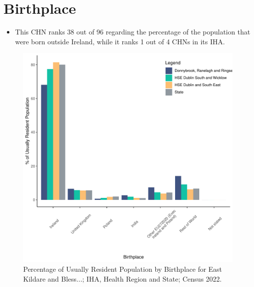 \documentclass{article}
\begin{document}
\section{Birthplace}\label{sect:Birth}
\begin{itemize}
\item This CHN ranks  38 out of 96 regarding the percentage of the population that were born outside Ireland, while it ranks  1 out of 4 CHNs in its IHA.
\end{itemize}
\begin{figure}[H]
	\centering
	\includegraphics[width = 130mm]{../figures/BirthED.pdf}
	\caption{Percentage of Usually Resident Population by Birthplace for East Kildare and Bless...; IHA, Health Region and State; Census 2022.}
	\label{fig:vbnv}
	\end{figure}
	
\end{document}
